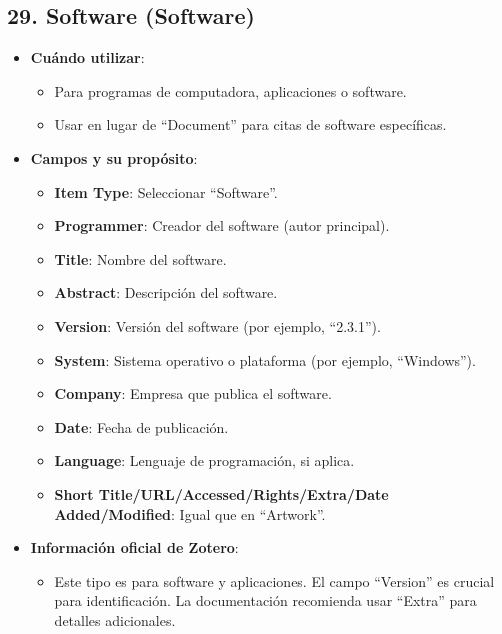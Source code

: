 \documentclass[
  jou,
  floatsintext,
  longtable,
  a4paper,
  nolmodern,
  notxfonts,
  notimes,
  colorlinks=true,linkcolor=blue,citecolor=blue,urlcolor=blue]{apa7}
\providecommand{\tightlist}{%
  \setlength{\itemsep}{0pt}\setlength{\parskip}{0pt}}
\begin{document}
\subsection{29. Software (Software)}\label{software-software}

\begin{itemize}
\tightlist
\item
  \textbf{Cuándo utilizar}:

  \begin{itemize}
  \tightlist
  \item
    Para programas de computadora, aplicaciones o software.
  \item
    Usar en lugar de ``Document'' para citas de software específicas.
  \end{itemize}
\item
  \textbf{Campos y su propósito}:

  \begin{itemize}
  \tightlist
  \item
    \textbf{Item Type}: Seleccionar ``Software''.
  \item
    \textbf{Programmer}: Creador del software (autor principal).
  \item
    \textbf{Title}: Nombre del software.
  \item
    \textbf{Abstract}: Descripción del software.
  \item
    \textbf{Version}: Versión del software (por ejemplo, ``2.3.1'').
  \item
    \textbf{System}: Sistema operativo o plataforma (por ejemplo,
    ``Windows'').
  \item
    \textbf{Company}: Empresa que publica el software.
  \item
    \textbf{Date}: Fecha de publicación.
  \item
    \textbf{Language}: Lenguaje de programación, si aplica.
  \item
    \textbf{Short Title/URL/Accessed/Rights/Extra/Date Added/Modified}:
    Igual que en ``Artwork''.
  \end{itemize}
\item
  \textbf{Información oficial de Zotero}:

  \begin{itemize}
  \tightlist
  \item
    Este tipo es para software y aplicaciones. El campo ``Version'' es
    crucial para identificación. La documentación recomienda usar
    ``Extra'' para detalles adicionales.
  \end{itemize}
\end{itemize}
\end{document}
